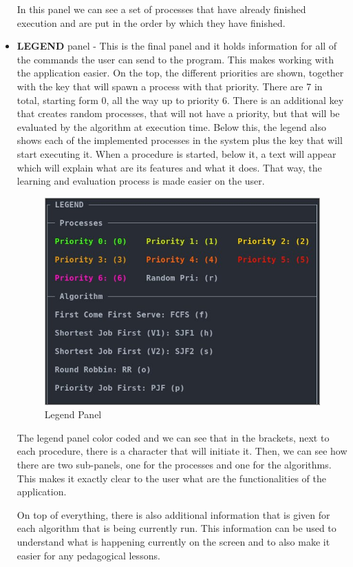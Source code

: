 \documentclass{article}
\begin{document}
\begin{itemize}
  In this panel we can see a set of processes that have already finished execution and are put in the order by which they have finished.

\item \textbf{LEGEND} panel - This is the final panel and it holds information for all of the commands the user can send to the program. This makes working with the application easier. On the top, the different priorities are shown, together with the key that will spawn a process with that priority. There are 7 in total, starting form 0, all the way up to priority 6. There is an additional key that creates random processes, that will not have a priority, but that will be evaluated by the algorithm at execution time. Below this, the legend also shows each of the implemented processes in the system plus the key that will start executing it. When a procedure is started, below it, a text will appear which will explain what are its features and what it does. That way, the learning and evaluation process is made easier on the user.

  \begin{figure}[H]
    \centering
    \includegraphics[width=0.75\columnwidth]{./pics/legend.jpg}
    \caption{Legend Panel}
    \label{fig:Legend Panel}
  \end{figure}

  The legend panel color coded and we can see that in the brackets, next to each procedure, there is a character that will initiate it. Then, we can see how there are two sub-panels, one for the processes and one for the algorithms. This makes it exactly clear to the user what are the functionalities of the application.

  On top of everything, there is also additional information that is given for each algorithm that is being currently run. This information can be used to understand what is happening currently on the screen and to also make it easier for any pedagogical lessons.


\end{itemize}
\end{document}
